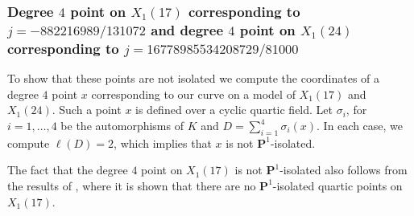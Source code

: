 \documentclass[11pt,reqno]{amsart}
\theoremstyle{plain}
\theoremstyle{definition}
\newcommand{\PP}{\mathbf P}
\begin{document}
\subsubsection{Degree $4$ point on $X_1(17)$ corresponding to $j=-882216989/131072$ and degree $4$ point on $X_1(24)$ corresponding to $j=16778985534208729/81000$ }
To show that these points are not isolated we compute the coordinates of a degree $4$ point $x$ corresponding to our curve on a model of $X_1(17)$ and $X_1(24)$. Such a point $x$ is defined over a cyclic quartic field. Let $\sigma_i$, for $i=1,\ldots, 4$ be the automorphisms of $K$ and $D=\sum_{i=1}^4\sigma_i(x)$. In each case, we compute $\ell(D)=2$, which implies that $x$ is not $\PP^1$-isolated.

The fact that the degree $4$ point on $X_1(17)$ is not $\PP^1$-isolated also follows from the results of \cite[Proposition 6.7]{DerickxMazurKamienny}, where it is shown that there are no $\PP^1$-isolated quartic points on $X_1(17)$.






\end{document}
